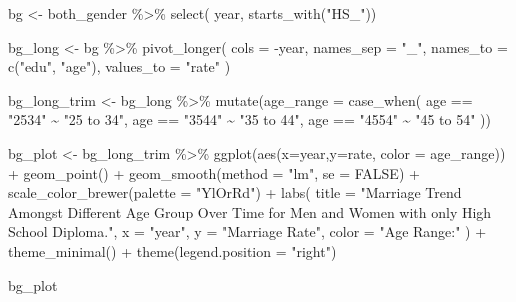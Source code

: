 \documentclass[
]{article}
\newenvironment{Shaded}{\begin{snugshade}}{\end{snugshade}}
\newcommand{\AttributeTok}[1]{\textcolor[rgb]{0.77,0.63,0.00}{#1}}
\newcommand{\ConstantTok}[1]{\textcolor[rgb]{0.00,0.00,0.00}{#1}}
\newcommand{\FunctionTok}[1]{\textcolor[rgb]{0.00,0.00,0.00}{#1}}
\newcommand{\NormalTok}[1]{#1}
\newcommand{\OtherTok}[1]{\textcolor[rgb]{0.56,0.35,0.01}{#1}}
\newcommand{\SpecialCharTok}[1]{\textcolor[rgb]{0.00,0.00,0.00}{#1}}
\newcommand{\StringTok}[1]{\textcolor[rgb]{0.31,0.60,0.02}{#1}}
\begin{document}
\begin{Shaded}
\begin{Highlighting}[]
\NormalTok{bg }\OtherTok{\textless{}{-}}\NormalTok{ both\_gender }\SpecialCharTok{\%\textgreater{}\%}
  \FunctionTok{select}\NormalTok{(}
\NormalTok{    year,}
    \FunctionTok{starts\_with}\NormalTok{(}\StringTok{"HS\_"}\NormalTok{)) }


\NormalTok{bg\_long }\OtherTok{\textless{}{-}}\NormalTok{ bg }\SpecialCharTok{\%\textgreater{}\%} 
  \FunctionTok{pivot\_longer}\NormalTok{(}
  \AttributeTok{cols =} \SpecialCharTok{{-}}\NormalTok{year,}
  \AttributeTok{names\_sep =} \StringTok{"\_"}\NormalTok{,}
  \AttributeTok{names\_to =} \FunctionTok{c}\NormalTok{(}\StringTok{"edu"}\NormalTok{, }\StringTok{"age"}\NormalTok{),}
  \AttributeTok{values\_to =} \StringTok{"rate"}
\NormalTok{) }


\NormalTok{bg\_long\_trim }\OtherTok{\textless{}{-}} 
\NormalTok{  bg\_long }\SpecialCharTok{\%\textgreater{}\%} 
  \FunctionTok{mutate}\NormalTok{(}\AttributeTok{age\_range =} \FunctionTok{case\_when}\NormalTok{(}
\NormalTok{    age }\SpecialCharTok{==} \StringTok{"2534"} \SpecialCharTok{\textasciitilde{}} \StringTok{"25 to 34"}\NormalTok{,}
\NormalTok{    age }\SpecialCharTok{==} \StringTok{"3544"} \SpecialCharTok{\textasciitilde{}} \StringTok{"35 to 44"}\NormalTok{,}
\NormalTok{    age }\SpecialCharTok{==} \StringTok{"4554"} \SpecialCharTok{\textasciitilde{}} \StringTok{"45 to 54"}
\NormalTok{  ))}

\NormalTok{bg\_plot }\OtherTok{\textless{}{-}}\NormalTok{ bg\_long\_trim }\SpecialCharTok{\%\textgreater{}\%} 
  \FunctionTok{ggplot}\NormalTok{(}\FunctionTok{aes}\NormalTok{(}\AttributeTok{x=}\NormalTok{year,}\AttributeTok{y=}\NormalTok{rate, }\AttributeTok{color =}\NormalTok{ age\_range)) }\SpecialCharTok{+}
  \FunctionTok{geom\_point}\NormalTok{() }\SpecialCharTok{+}
  \FunctionTok{geom\_smooth}\NormalTok{(}\AttributeTok{method =} \StringTok{"lm"}\NormalTok{, }\AttributeTok{se =} \ConstantTok{FALSE}\NormalTok{) }\SpecialCharTok{+}
  \FunctionTok{scale\_color\_brewer}\NormalTok{(}\AttributeTok{palette =} \StringTok{"YlOrRd"}\NormalTok{) }\SpecialCharTok{+}
  \FunctionTok{labs}\NormalTok{(}
    \AttributeTok{title =} \StringTok{"Marriage Trend Amongst Different Age Group Over Time for Men and Women with only High School Diploma."}\NormalTok{,}
    \AttributeTok{x =} \StringTok{"year"}\NormalTok{,}
    \AttributeTok{y =} \StringTok{"Marriage Rate"}\NormalTok{,}
    \AttributeTok{color =} \StringTok{"Age Range:"}
\NormalTok{  ) }\SpecialCharTok{+}
  \FunctionTok{theme\_minimal}\NormalTok{() }\SpecialCharTok{+}
  \FunctionTok{theme}\NormalTok{(}\AttributeTok{legend.position =} \StringTok{"right"}\NormalTok{)}


\NormalTok{bg\_plot}
\end{Highlighting}
\end{Shaded}
\end{document}
